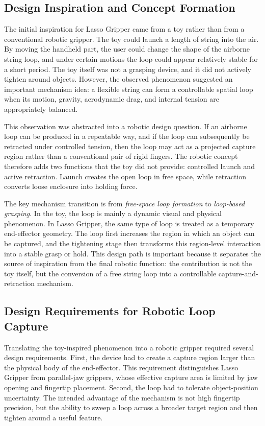 \subsection{Design Inspiration and Concept Formation}

The initial inspiration for Lasso Gripper came from a toy rather than from a conventional robotic gripper. The toy could launch a length of string into the air. By moving the handheld part, the user could change the shape of the airborne string loop, and under certain motions the loop could appear relatively stable for a short period. The toy itself was not a grasping device, and it did not actively tighten around objects. However, the observed phenomenon suggested an important mechanism idea: a flexible string can form a controllable spatial loop when its motion, gravity, aerodynamic drag, and internal tension are appropriately balanced.

This observation was abstracted into a robotic design question. If an airborne loop can be produced in a repeatable way, and if the loop can subsequently be retracted under controlled tension, then the loop may act as a projected capture region rather than a conventional pair of rigid fingers. The robotic concept therefore adds two functions that the toy did not provide: controlled launch and active retraction. Launch creates the open loop in free space, while retraction converts loose enclosure into holding force.

The key mechanism transition is from \emph{free-space loop formation} to \emph{loop-based grasping}. In the toy, the loop is mainly a dynamic visual and physical phenomenon. In Lasso Gripper, the same type of loop is treated as a temporary end-effector geometry. The loop first increases the region in which an object can be captured, and the tightening stage then transforms this region-level interaction into a stable grasp or hold. This design path is important because it separates the source of inspiration from the final robotic function: the contribution is not the toy itself, but the conversion of a free string loop into a controllable capture-and-retraction mechanism.

\subsection{Design Requirements for Robotic Loop Capture}

Translating the toy-inspired phenomenon into a robotic gripper required several design requirements. First, the device had to create a capture region larger than the physical body of the end-effector. This requirement distinguishes Lasso Gripper from parallel-jaw grippers, whose effective capture area is limited by jaw opening and fingertip placement. Second, the loop had to tolerate object-position uncertainty. The intended advantage of the mechanism is not high fingertip precision, but the ability to sweep a loop across a broader target region and then tighten around a useful feature.

